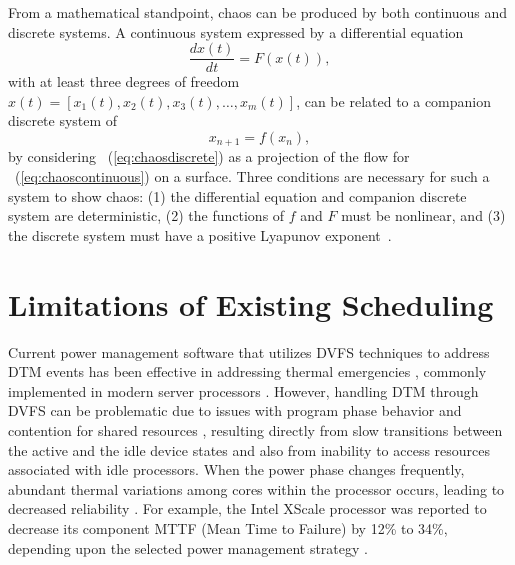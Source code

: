 From a mathematical standpoint, chaos can be produced by both continuous
and discrete systems.  A continuous system expressed by a differential
equation
\begin{equation}
  \label{eq:chaoscontinuous}
  \dfrac{dx(t)}{dt} = F(x(t)),
\end{equation}
with at least three degrees of freedom
$x(t)=[x_{1}(t),x_{2}(t),x_{3}(t),\ldots, x_{m}(t)]$,
can be related to a companion discrete system of
\begin{equation}
  \label{eq:chaosdiscrete}
  x_{n+1}=f(x_{n}),
\end{equation}
by considering \equationname~(\ref{eq:chaosdiscrete}) as a projection of
the flow for \equationname~(\ref{eq:chaoscontinuous}) on a surface.
Three conditions are necessary for such a system to show chaos: (1) the
differential equation and companion discrete system are
deterministic, (2) the functions of $f$ and $F$ must be nonlinear, and (3) the
discrete system must have a positive Lyapunov exponent~\cite{Liu2010}.

\section{Limitations of Existing Scheduling}
\label{sec:shortc-comp-workl}
Current power management software that utilizes DVFS techniques to
address DTM events has been effective in addressing thermal emergencies
\cite{Donald2006,Hanson2007}, commonly implemented in modern server
processors \cite{AMD2007,Intel2009}.  However, handling DTM through DVFS
can be problematic due to issues with program phase behavior and
contention for shared resources \cite{Bircher2008,Coskun2008d},
resulting directly from slow transitions between the active and the idle
device states and also from inability to access resources associated
with idle processors.  When the power phase changes frequently, abundant
thermal variations among cores within the processor occurs, leading to
decreased reliability \cite{Rosing2007,Coskun2008d,Kursun2009}.  For
example, the Intel XScale processor was reported to decrease its
component MTTF (Mean Time to Failure) by 12\% to 34\%, depending upon
the selected power management strategy \cite{Rosing2007}.

